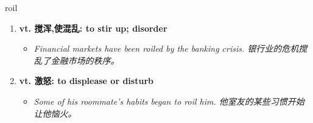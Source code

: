 
\begin{frame}
{\huge roil}
\begin{center}
\begin{enumerate}\Large
  \item \textbf{vt. 搅浑,使混乱: to stir up; disorder}
  \begin{itemize}
    \item \em{\Large{Financial markets have been roiled by the banking crisis. 银行业的危机搅乱了金融市场的秩序。}}
  \end{itemize}
  \item \textbf{vt. 激怒: to displease or disturb}
  \begin{itemize}
    \item \em{\Large{Some of his roommate’s habits began to roil him. 他室友的某些习惯开始让他恼火。}}
  \end{itemize}
\end{enumerate}
\end{center}
\end{frame}
